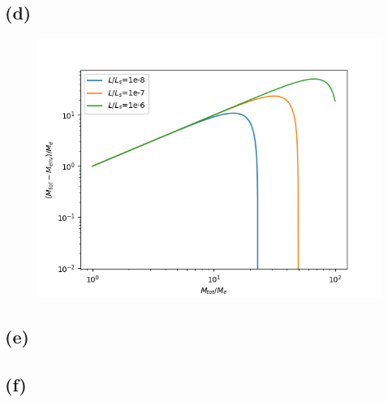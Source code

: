\documentclass[a4paper,12pt]{article}
\begin{document}
\subsection*{(d)}
\begin{figure}[htbp]
    \centering
    \includegraphics*[width=12cm]{e5.png}
\end{figure}

\subsection*{(e)}

\subsection*{(f)}
\end{document}
